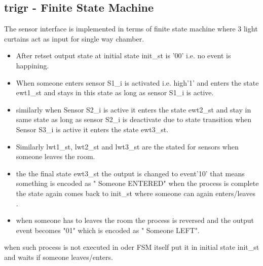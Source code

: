 \documentclass[12pt,a4 paper] {report}
\begin{document}
\subsection*{trigr - Finite State Machine}
The sensor interface is implemented in terms of finite state machine where 3 light curtains act as input for single way chamber. \\
\begin{itemize}
	\item After retset output state at initial state init\_st is '00' i.e. no event is happining. \\
	\item When someone enters  sensor S1\_i is activated i.e. high'1' and enters the state ewt1\_st and stays in this state as long as sensor S1\_i is active.\\

	\item similarly when Sensor S2\_i is active it enters the state ewt2\_st and stay in same state as long as sensor S2\_i is deactivate due to state transition when Sensor S3\_i is active it enters the state ewt3\_st. \\
	\item Similarly lwt1\_st, lwt2\_st and lwt3\_st are the stated for sensors when someone leaves the room. \\
	\item the the final state ewt3\_st the output is changed to event'10' that means something is encoded as " Someone ENTERED" when the process is complete the state again comes back to init\_st where someone can again enters/leaves .\\
	\item when someone has to leaves the room the process is reversed and the output event becomes "01" which is encoded as " Someone LEFT".\\
	
	
\end{itemize}
when such process is not executed in oder FSM itself put it in initial state init\_st and waits if someone leaves/enters.
\end{document}
